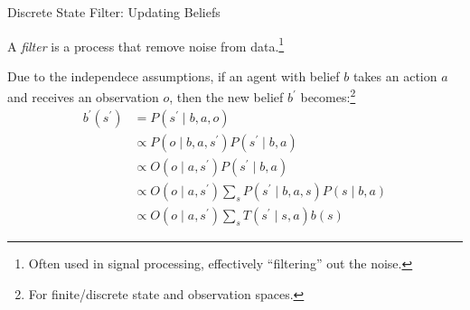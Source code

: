 \begin{frame}[fragile]{Discrete State Filter: Updating Beliefs}

A \textit{filter} is a process that remove noise from data.\footnote{Often used in signal processing, effectively ``filtering'' out the noise.}

\vspace{5mm}

Due to the independece assumptions, if an agent with belief $b$ takes an action $a$ and receives an observation $o$, then the new belief $b^\prime$ becomes:\footnote{For finite/discrete state and observation spaces.}
\begin{align*}
    b^\prime(s^\prime) &= P(s^\prime \mid b, a, o)\\
                       &\propto P(o \mid b, a, s^\prime) P(s^\prime \mid b, a) \tag{Bayes' rule}\\
                       &\propto O(o \mid a, s^\prime) P(s^\prime \mid b, a)\tag{observation definition}\\
                       &\propto O(o \mid a, s^\prime) \sum_s P(s^\prime \mid b, a, s) P(s \mid b, a) \tag{law of total probability}\\
                       &\propto O(o \mid a, s^\prime)\sum_s T(s^\prime \mid s, a)b(s) \tag{state transition model}
\end{align*}


\end{frame}